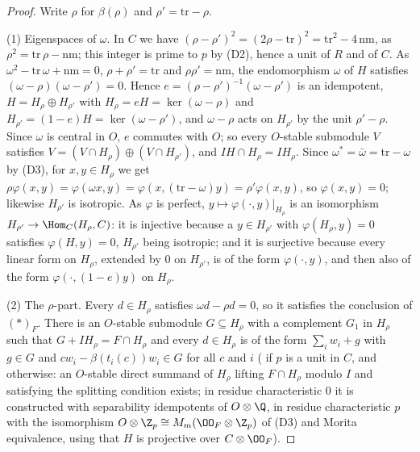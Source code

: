 \begin{proof}
Write $\rho$ for $\beta(\rho)$ and $\rho'=\mathrm{tr}-\rho$.

(1) Eigenspaces of $\omega$. In $C$ we have $(\rho-\rho')^2=(2\rho-\mathrm{tr})^2=\mathrm{tr}^2-4\,\mathrm{nm}$, as $\rho^2=\mathrm{tr}\,\rho-\mathrm{nm}$; this
integer is prime to $p$ by (D2), hence a unit of $R$ and of $C$. As $\omega^2-\mathrm{tr}\,\omega+\mathrm{nm}=0$, $\rho+\rho'=\mathrm{tr}$ and
$\rho\rho'=\mathrm{nm}$, the endomorphism $\omega$ of $H$ satisfies $(\omega-\rho)(\omega-\rho')=0$. Hence $e=(\rho-\rho')^{-1}(\omega-\rho')$ is an
idempotent, $H=H_\rho\oplus H_{\rho'}$ with $H_\rho=eH=\ker(\omega-\rho)$ and $H_{\rho'}=(1-e)H=\ker(\omega-\rho')$, and $\omega-\rho$ acts on
$H_{\rho'}$ by the unit $\rho'-\rho$. Since $\omega$ is central in $O$, $e$ commutes with $O$; so every $O$-stable submodule $V$ satisfies
$V=(V\cap H_\rho)\oplus(V\cap H_{\rho'})$, and $IH\cap H_\rho=IH_\rho$. Since $\omega^*=\bar\omega=\mathrm{tr}-\omega$ by (D3), for $x,y\in H_\rho$ we
get $\rho\varphi(x,y)=\varphi(\omega x,y)=\varphi(x,(\mathrm{tr}-\omega)y)=\rho'\varphi(x,y)$, so $\varphi(x,y)=0$; likewise $H_{\rho'}$ is isotropic.
As $\varphi$ is perfect, $y\mapsto\varphi(\cdot,y)|_{H_\rho}$ is an isomorphism $H_{\rho'}\to\Hom_C(H_\rho,C)$: it is injective because a
$y\in H_{\rho'}$ with $\varphi(H_\rho,y)=0$ satisfies $\varphi(H,y)=0$, $H_{\rho'}$ being isotropic; and it is surjective because every linear form
on $H_\rho$, extended by $0$ on $H_{\rho'}$, is of the form $\varphi(\cdot,y)$, and then also of the form $\varphi(\cdot,(1-e)y)$ on $H_\rho$.

(2) The $\rho$-part. Every $d\in H_\rho$ satisfies $\omega d-\rho d=0$, so it satisfies the conclusion of $(*)_F$. There is an $O$-stable submodule
$G\subseteq H_\rho$ with a complement $G_1$ in $H_\rho$ such that $G+IH_\rho=F\cap H_\rho$ and every $d\in H_\rho$ is of the form $\sum_iw_i+g$ with
$g\in G$ and $cw_i-\beta(t_i(c))w_i\in G$ for all $c$ and $i$ ( if $p$ is a unit
in $C$, and  otherwise: an $O$-stable direct summand of $H_\rho$ lifting $F\cap
H_\rho$ modulo $I$ and satisfying the splitting condition exists; in residue characteristic $0$ it is constructed with separability idempotents of
$O\otimes\Q$, in residue characteristic $p$ with the isomorphism $O\otimes\Z_p\cong M_m(\OO_F\otimes\Z_p)$ of (D3) and Morita equivalence, using that
$H$ is projective over $C\otimes\OO_F$).


\end{proof}
